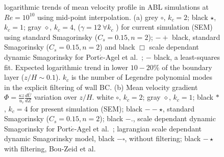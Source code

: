 \documentclass[times]{fldauth}
\begin{document}
\begin{figure}
        \caption{logarithmic trends of mean velocity profile in ABL simulations at $Re = 10^{10}$ using mid-point interpolation. (a) grey $\circ$, $k_{c}=2$; black $\star$, $k_{c}=1$; gray $\diamond$, $k_{c}=4$, ($\gamma = 12\ \forall k_c$ ) for current simulation (SEM) using standard Smagorinsky ($C_s = 0.15, n = 2$); $-+$ black, standard Smagorinsky ($C_s = 0.15, n = 2$) and black $\Box$ scale dependant dynamic Smagorinsky for Port$\acute{e}$-Agel et al.~\cite{porte1fun}; $-$ black, a least-squares fit. Expected logarithmic trend in lower $10-20 \%$ of the boundary layer ($z/H \sim 0.1$). $k_{c}$ is the number of Legendre polynomial modes in the explicit filtering of wall BC. (b) Mean velocity gradient $\Phi = \frac{\kappa z}{u_{\tau}}\frac{d \overline{U}}{dZ}$ variation over $z/H$.  white $\circ$, $k_{c}=2$; gray $\diamond$, $k_{c}=1$; black $*$, $k_{c}=4$ for present simulation (SEM); black $--\star$, standard Smagorinsky ($C_s = 0.15, n = 2$); black $-.$, scale dependant dynamic Smagorinsky for Port$\acute{e}$-Agel et al.~\cite{porte1fun}; lagrangian scale dependant dynamic Smagorinsky model, black $-\square$, without filtering; black $-\star$ with filtering, Bou-Zeid et al.~\cite{bou1}  }\label{fig:stat}
\end{figure}
\end{document}

